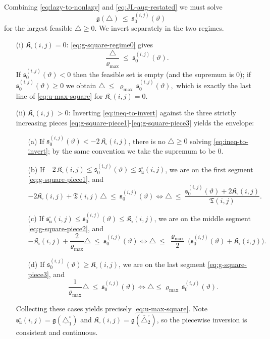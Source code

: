 \documentclass[twoside,11pt]{article}
\numberwithin{equation}{section}
\numberwithin{theorem}{section}
\numberwithin{example}{section}
\begin{document}
Combining \eqref{eq:lazy-to-nonlazy} and \eqref{eq:JL-aug-restated} we must solve
\begin{equation}
\label{eq:ineq-to-invert}
\mathfrak g(\triangle)\ \le\ \mathfrak s_0^{(i,j)}(\vartheta)
\end{equation}
for the largest feasible $\triangle\ge 0$. We invert separately in the two regimes.
\begin{itemize}
\item[(i)] $\mathfrak K_{\square}(i,j)=0$:
\eqref{eq:g-square-regime0} gives
\[
\frac{\triangle}{\varrho_{\max}}\ \le\ \mathfrak s_0^{(i,j)}(\vartheta).
\]
If $\mathfrak s_0^{(i,j)}(\vartheta)<0$ then the feasible set is empty (and the supremum is $0$); if $\mathfrak s_0^{(i,j)}(\vartheta)\ge 0$ we obtain
\(
\triangle\ \le\ \varrho_{\max}\,\mathfrak s_0^{(i,j)}(\vartheta),
\)
which is exactly the last line of \eqref{eq:u-max-square} for $\mathfrak K_{\square}(i,j)=0$.
\item[(ii)] $\mathfrak K_{\square}(i,j)>0$:
Inverting \eqref{eq:ineq-to-invert} against the three strictly increasing pieces \eqref{eq:g-square-piece1}-\eqref{eq:g-square-piece3} yields the envelope:
\begin{itemize}
\item[(a)] If $\mathfrak s_0^{(i,j)}(\vartheta) < -2\,\mathfrak K_{\square}(i,j)$, there is no $\triangle\ge 0$ solving \eqref{eq:ineq-to-invert}; by the same convention we take the supremum to be $0$.
\item[(b)] If $-2\,\mathfrak K_{\square}(i,j)\le \mathfrak s_0^{(i,j)}(\vartheta)\le \mathfrak s_{\mathfrak u}^{\square}(i,j)$, we are on the first segment \eqref{eq:g-square-piece1}, and
\[
-2\mathfrak K_{\square}(i,j)+\mathfrak T(i,j)\,\triangle\ \le\ \mathfrak s_0^{(i,j)}(\vartheta)
\iff
\triangle\ \le\ \frac{\mathfrak s_0^{(i,j)}(\vartheta)+2\mathfrak K_{\square}(i,j)}{\ \mathfrak T(i,j)\ }.
\]
\item[(c)] If $\mathfrak s_{\mathfrak u}^{\square}(i,j)\le \mathfrak s_0^{(i,j)}(\vartheta)\le \mathfrak K_{\square}(i,j)$, we are on the middle segment \eqref{eq:g-square-piece2}, and
\[
-\mathfrak K_{\square}(i,j)+\frac{2}{\varrho_{\max}}\triangle\ \le\ \mathfrak s_0^{(i,j)}(\vartheta)
\iff
\triangle\ \le\ \frac{\varrho_{\max}}{2}\,\bigl(\mathfrak s_0^{(i,j)}(\vartheta)+\mathfrak K_{\square}(i,j)\bigr).
\]
\item[(d)] If $\mathfrak s_0^{(i,j)}(\vartheta)\ge \mathfrak K_{\square}(i,j)$, we are on the last segment \eqref{eq:g-square-piece3}, and
\[
\frac{1}{\varrho_{\max}}\triangle\ \le\ \mathfrak s_0^{(i,j)}(\vartheta)
\iff
\triangle \le \varrho_{\max}\,\mathfrak s_0^{(i,j)}(\vartheta).
\]
\end{itemize}
Collecting these cases yields precisely \eqref{eq:u-max-square}. Note $\mathfrak s_{\mathfrak u}^{\square} (i,j)= \mathfrak g(\underline{\triangle}_1^{\square})$ and $\mathfrak K_{\square}(i,j)=\mathfrak g(\overline{\triangle}_2^{\square})$, so the piecewise inversion is consistent and continuous.
\end{itemize}
\end{document}
